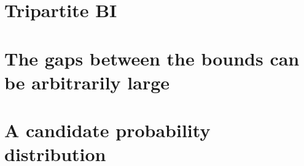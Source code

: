 \section{Tripartite BI}
\section{The gaps between the bounds can be arbitrarily large}
\section{A candidate probability distribution}
